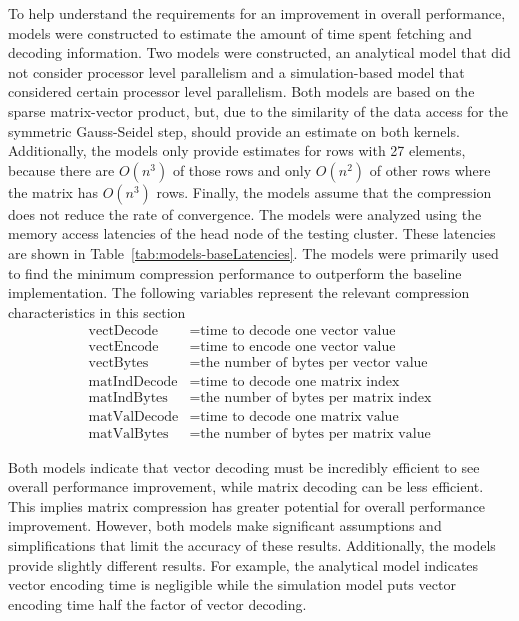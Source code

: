 
To help understand the requirements for an improvement in overall performance, models were constructed to estimate the amount of time spent fetching and decoding information.
Two models were constructed, an analytical model that did not consider processor level parallelism and a simulation-based model that considered certain processor level parallelism.
Both models are based on the sparse matrix-vector product, but, due to the similarity of the data access for the symmetric Gauss-Seidel step, should provide an estimate on both kernels.
Additionally, the models only provide estimates for rows with 27 elements, because there are \(O(n^3)\) of those rows and only \(O(n^2)\) of other rows where the matrix has \(O(n^3)\) rows.
Finally, the models assume that the compression does not reduce the rate of convergence.
The models were analyzed using the memory access latencies of the head node of the testing cluster.
These latencies are shown in Table~\ref{tab:models-baseLatencies}.
The models were primarily used to find the minimum compression performance to outperform the baseline implementation.
The following variables represent the relevant compression characteristics in this section
\begin{align*}
	\mathrm{vectDecode} &= \text{time to decode one vector value} \\
	\mathrm{vectEncode}  &= \text{time to encode one vector value} \\
	\mathrm{vectBytes} &= \text{the number of bytes per vector value} \\
	\mathrm{matIndDecode} &= \text{time to decode one matrix index} \\
	\mathrm{matIndBytes} &= \text{the number of bytes per matrix index} \\
	\mathrm{matValDecode} &= \text{time to decode one matrix value} \\
	\mathrm{matValBytes} &= \text{the number of bytes per matrix value}
\end{align*}

Both models indicate that vector decoding must be incredibly efficient to see overall performance improvement, while matrix decoding can be less efficient.
This implies matrix compression has greater potential for overall performance improvement.
However, both models make significant assumptions and simplifications that limit the accuracy of these results.
Additionally, the models provide slightly different results.
For example, the analytical model indicates vector encoding time is negligible while the simulation model puts vector encoding time half the factor of vector decoding.

